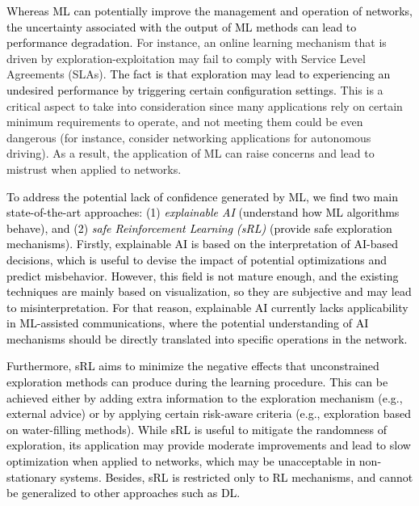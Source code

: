 \documentclass[journal]{IEEEtran}
\begin{document}
	\textcolor{black}{Whereas ML can potentially improve the management and operation of networks, the uncertainty associated with the output of ML methods can lead to performance degradation.} For instance, an online learning mechanism that is driven by exploration-exploitation may fail to comply with Service Level Agreements (SLAs). \textcolor{black}{The fact is that exploration may lead to \textcolor{black}{experiencing an} undesired performance by triggering certain configuration settings.} This is a critical aspect to take into consideration since many applications rely on certain minimum requirements to operate, and not meeting them could be even dangerous (for instance, consider networking applications for autonomous driving). As a result, the application of ML can raise concerns and lead to mistrust when applied to networks.
	
	\textcolor{black}{To address the potential lack of confidence generated by ML, we find two main state-of-the-art approaches: (1) \textit{explainable AI} \cite{samek} (understand how ML algorithms behave), and (2) \textit{safe Reinforcement Learning (sRL)} \cite{safe} (provide safe exploration mechanisms). Firstly, explainable AI is based on the interpretation of AI-based decisions, which is useful to devise the impact of potential optimizations and predict misbehavior. However, this field is not mature enough, and the existing techniques are mainly based on visualization, so they are subjective and may lead to misinterpretation. For that reason, explainable AI currently lacks applicability in ML-assisted communications, where the potential understanding of AI mechanisms should be directly translated into specific operations in the network.}
		
	\textcolor{black}{Furthermore, sRL aims to minimize the negative effects that unconstrained exploration methods can produce during the learning procedure. This can be achieved either by adding extra information to the exploration mechanism (e.g., external advice) or by applying certain risk-aware criteria (e.g., exploration based on water-filling methods). While sRL is useful to mitigate the randomness of exploration, its application may provide moderate improvements and lead to slow optimization when applied to networks, which may be unacceptable in non-stationary systems. Besides, sRL is restricted only to RL mechanisms, and cannot be generalized to other approaches such as DL.}
\end{document}
